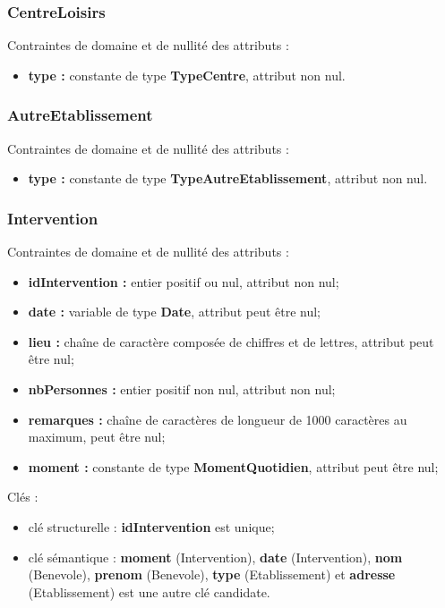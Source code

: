 \subsubsection*{CentreLoisirs}
Contraintes de domaine et de nullité des attributs :
\begin{itemize}
	\item \textbf{type :} constante de type \textbf{TypeCentre}, attribut non nul.\\
\end{itemize}

\subsubsection*{AutreEtablissement}
Contraintes de domaine et de nullité des attributs :
\begin{itemize}
	\item \textbf{type :} constante de type \textbf{TypeAutreEtablissement}, attribut non nul.\\
\end{itemize}

\subsubsection*{Intervention} 
Contraintes de domaine et de nullité des attributs :
\begin{itemize}
 	\item \textbf{idIntervention :} entier positif ou nul, attribut non nul;
	\item \textbf{date :} variable de type \textbf{Date}, attribut peut être nul;
	\item \textbf{lieu :} chaîne de caractère composée de chiffres et de lettres, attribut peut être nul;
	\item \textbf{nbPersonnes :} entier positif non nul, attribut non nul;  
	\item \textbf{remarques :} chaîne de caractères de longueur de 1000 caractères au maximum, peut être nul;
	\item \textbf{moment :} constante de type \textbf{MomentQuotidien}, attribut peut être nul;\\
\end{itemize}  

Clés : 
\begin{itemize}
\item clé structurelle : \textbf{idIntervention} est unique;
\item clé sémantique : \textbf{moment} (Intervention), \textbf{date} (Intervention), \textbf{nom} (Benevole), \textbf{prenom} (Benevole), \textbf{type} (Etablissement) et \textbf{adresse} (Etablissement) est une autre clé candidate. \\ 
\end{itemize}

